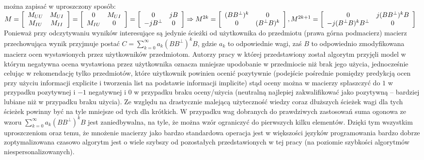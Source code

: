 \documentclass{pracamgr}
\begin{document}
    można zapisać w uproszczony sposób:\newline
    $M=
     \left[\begin{array}{cc}
     M_{UU}&M_{UI}\\
     M_{IU}&M_{II}
     \end{array}\right]
     =
     \left[\begin{array}{cc}
     0&M_{UI}\\
     M_{IU}&0
     \end{array}\right]
     =
     \left[\begin{array}{cc}
     0&jB\\
     -jB^\bot&0
     \end{array}\right]
     \Rightarrow\newline
     M^{2k}=
     \left[\begin{array}{cc}
     (BB^\bot)^k&0\\
     0&(B^\bot B)^k
     \end{array}\right],
     M^{2k+1}=
     \left[\begin{array}{cc}
     0&j(BB^\bot)^kB\\
     -j(B^\bot B)^kB^\bot&0
     \end{array}\right]
    $\newline
    Ponieważ przy odczytywaniu wyników interesujące są jedynie ścieżki od użytkownika do przedmiotu (prawa górna podmacierz)
    macierz przechowująca wynik przyjmuje postać $C=\sum\limits_{k=0}^{\infty}a_k(BB^\bot)^kB$, gdzie $a_k$ to odpowiednie wagi,
    zaś $B$ to odpowiednio zmodyfikowana macierz ocen wystawionych przez użytkowników przedmiotom.
    Autorzy pracy w której przedstawiony został algorytm przyjęli model w którym negatywna ocena wystawiona przez użytkownika
    oznacza mniejsze upodobanie w przedmiocie niż brak jego użycia, jednocześnie celując w rekomendację tylko przedmiotów,
    które użytkownik powinien ocenić pozytywnie (podejście pośrednie pomiędzy predykcją ocen przy użyciu informacji explicite
    i tworzenia list na podstawie informacji implicite) stąd oceny można w macierzy spłaszczyć do $1$ w przypadku pozytywnej i $-1$ negatywnej
    i $0$ w przypadku braku oceny/użycia (neutralną najlepiej zakwalifikować jako pozytywną -- bardziej lubiane niż w przypadku braku użycia).
    Ze względu na drastycznie malejącą użyteczność wiedzy coraz dłuższych ścieżek wagi dla tych ścieżek powinny być na tyle mniejsze od tych dla krótkich.
    W przypadku wag dobranych do prawdziwych zastosowań suma ogonowa ze wzoru $\sum\limits_{k=0}^{\infty}a_k(BB^\bot)^kB$ jest zaniedbywalna, na tyle,
    że można wzór ograniczyć do pierwszych kilku elementów.\newline
    Dzięki tym wszystkim uproszczeniom oraz temu,
    że mnożenie macierzy jako bardzo standardowa operacja jest w większości języków programowania bardzo dobrze zoptymalizowana czasowo algorytm
    jest o wiele szybszy od pozostałych przedstawionych w tej pracy (na poziomie szybkości algorytmów niespersonalizowanych).
\end{document}

